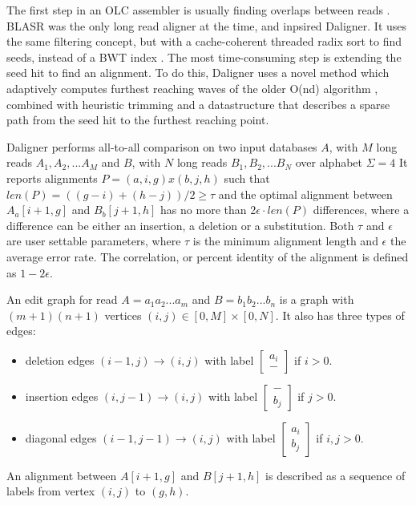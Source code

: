 \documentclass[../main/thesis.tex]{subfiles}
\begin{document}
The first step in an \ac{OLC} assembler is usually finding overlaps between reads \cite{OLC}.
BLASR \cite{BLASR} was the only long read aligner at the time, and inpsired Daligner.
It uses the same filtering concept, but with a cache-coherent threaded radix sort to find seeds, instead of a BWT index \cite{BWT}.
The most time-consuming step is extending the seed hit to find an alignment.
To do this, Daligner uses a novel method which adaptively computes furthest reaching waves of the older O(nd) algorithm \cite{O_ND}, combined with heuristic trimming and a datastructure that describes a sparse path from the seed hit to the furthest reaching point.

Daligner performs all-to-all comparison on two input databases $A$, with $M$ long reads $A_1, A_2,...A_M$ and $B$, with $N$ long reads $B_1, B_2,...B_N$ over alphabet $\Sigma = 4$
 It reports alignments $P = (a,i,g)x(b,j,h)$ such that $len(P) = ((g-i)+(h-j))/2 \ge \tau$ and the optimal alignment between $A_a[i+1,g]$ and $B_b[j+1,h]$ has no more than 2$\epsilon \cdot len(P)$ differences, where a difference can be either an insertion, a deletion or a substitution.
Both $\tau$ and $\epsilon$ are user settable parameters, where $\tau$ is the minimum alignment length and $\epsilon$ the average error rate.
The correlation, or percent identity of the alignment is defined as $1-2\epsilon$.

An edit graph for read $A=a_1a_2...a_m$ and $B=b_1b_2...b_n$ is a graph with $(m+1)(n+1)$ vertices $(i,j) \in [0,M]\times[0,N]$.
It also has three types of edges:
\begin{itemize}
\item deletion edges $(i-1,j) \rightarrow (i,j)$ with label
$\begin{bmatrix}
a_i \\ -
\end{bmatrix}$ if $i > 0$.
\item insertion edges $(i,j-1) \rightarrow (i,j)$ with label 
$\begin{bmatrix}
- \\ b_j
\end{bmatrix}$ if $j > 0$.
\item diagonal edges $(i-1,j-1) \rightarrow (i,j)$ with label
$\begin{bmatrix}
a_i \\ b_j
\end{bmatrix}$ if $i,j > 0$.
\end{itemize}


An alignment between $A[i+1,g]$ and $B[j+1,h]$ is described as a sequence of labels from vertex $(i,j)$ to $(g,h)$.
\end{document}
